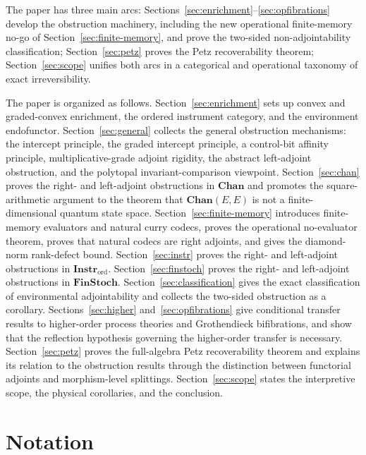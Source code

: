 \documentclass[11pt]{article}
\begin{document}
The paper has three main arcs:
Sections~\ref{sec:enrichment}--\ref{sec:opfibrations} develop the obstruction
machinery, including the new operational finite-memory no-go of
Section~\ref{sec:finite-memory}, and prove the two-sided non-adjointability
classification; Section~\ref{sec:petz} proves the Petz recoverability theorem;
Section~\ref{sec:scope} unifies both arcs in a categorical and operational
taxonomy of exact irreversibility.

The paper is organized as follows. Section~\ref{sec:enrichment} sets up convex
and graded-convex enrichment, the ordered instrument category, and the
environment endofunctor. Section~\ref{sec:general} collects the general
obstruction mechanisms: the intercept principle, the graded intercept
principle, a control-bit affinity principle, multiplicative-grade adjoint
rigidity, the abstract left-adjoint obstruction, and the polytopal
invariant-comparison viewpoint. Section~\ref{sec:chan} proves the right- and
left-adjoint obstructions in $\mathbf{Chan}$ and promotes the square-arithmetic
argument to the theorem that $\mathbf{Chan}(E,E)$ is not a finite-dimensional
quantum state space. Section~\ref{sec:finite-memory} introduces finite-memory
evaluators and natural curry codecs, proves the operational no-evaluator
theorem, proves that natural codecs are right adjoints, and gives the
diamond-norm rank-defect bound. Section~\ref{sec:instr} proves the right- and
left-adjoint obstructions in $\mathbf{Instr}_{\mathrm{ord}}$.
Section~\ref{sec:finstoch} proves the right- and left-adjoint obstructions in
$\mathbf{FinStoch}$. Section~\ref{sec:classification} gives the exact
classification of environmental adjointability and collects the two-sided
obstruction as a corollary. Sections~\ref{sec:higher} and~\ref{sec:opfibrations}
give conditional transfer results to higher-order process theories and
Grothendieck bifibrations, and show that the reflection hypothesis governing
the higher-order transfer is necessary. Section~\ref{sec:petz} proves the full-algebra Petz
recoverability theorem and explains its relation to the obstruction results
through the distinction between functorial adjoints and morphism-level
splittings. Section~\ref{sec:scope} states the interpretive scope, the
physical corollaries, and the conclusion.

\section*{Notation}
\end{document}
